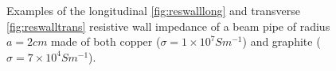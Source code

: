 \begin{figure}

\caption{Examples of the longitudinal \ref{fig:reswalllong} and transverse \ref{fig:reswalltrans} resistive wall impedance of a beam pipe of radius $a = 2cm$ made of both copper ($\sigma = 1 \times 10^{7} S m^{-1}$) and graphite ($\sigma = 7 \times 10^{4} S m^{-1}$).}
\label{fig:resWallImpComp}
\end{figure}

